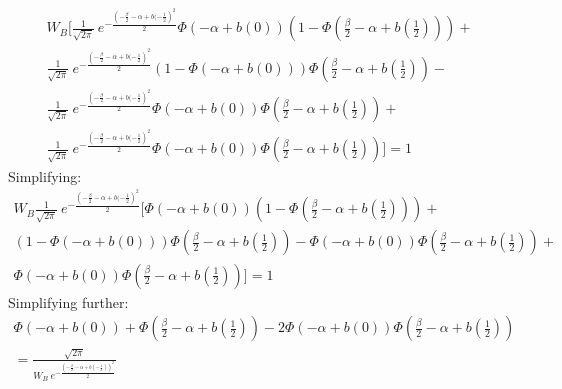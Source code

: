 \documentclass[12pt]{article}
\begin{document}
\begin{itemize}
\begin{itemize}
				\begin{multline}
					W_B \biggl[ \frac{1}{\sqrt{2\pi}} \: e^{- \frac{\left(-\frac{\beta}{2} - \alpha + b(-\frac{1}{2}\right)^2}{2}} \Phi\left(- \alpha + b(0) \right)\left(1-\Phi\left(\frac{\beta}{2} - \alpha + b(\frac{1}{2}) \right)\right)  + \\
					\frac{1}{\sqrt{2\pi}} \: e^{- \frac{\left(-\frac{\beta}{2} - \alpha + b(-\frac{1}{2}\right)^2}{2}} \left(1-\Phi\left(- \alpha + b(0) \right)\right)\Phi\left(\frac{\beta}{2} - \alpha + b(\frac{1}{2}) \right) - \\
					\frac{1}{\sqrt{2\pi}} \: e^{- \frac{\left(-\frac{\beta}{2} - \alpha + b(-\frac{1}{2}\right)^2}{2}} \Phi\left(- \alpha + b(0) \right)\Phi\left(\frac{\beta}{2} - \alpha + b(\frac{1}{2}) \right) + \\
					\frac{1}{\sqrt{2\pi}} \: e^{- \frac{\left(-\frac{\beta}{2} - \alpha + b(-\frac{1}{2}\right)^2}{2}} \Phi\left(- \alpha + b(0) \right)\Phi\left(\frac{\beta}{2} - \alpha + b(\frac{1}{2}) \right) \biggr]  = 1
				\end{multline}
			Simplifying:
			\begin{multline}
					W_B \frac{1}{\sqrt{2\pi}} \: e^{- \frac{\left(-\frac{\beta}{2} - \alpha + b(-\frac{1}{2}\right)^2}{2}} \biggl[ \Phi\left(- \alpha + b(0) \right)\left(1-\Phi\left(\frac{\beta}{2} - \alpha + b(\frac{1}{2}) \right)\right)  + \\
					\left(1-\Phi\left(- \alpha + b(0) \right)\right)\Phi\left(\frac{\beta}{2} - \alpha + b(\frac{1}{2}) \right) - 
					\Phi\left(- \alpha + b(0) \right)\Phi\left(\frac{\beta}{2} - \alpha + b(\frac{1}{2}) \right) + \\
					\Phi\left(- \alpha + b(0) \right)\Phi\left(\frac{\beta}{2} - \alpha + b(\frac{1}{2}) \right) \biggr]  = 1
				\end{multline}
			Simplifying further:
			  \begin{multline}
					\Phi\left(- \alpha + b(0) \right)+ \Phi\left(\frac{\beta}{2} - \alpha + b(\frac{1}{2}) \right) 
					- 2\Phi\left(- \alpha + b(0) \right)\Phi\left(\frac{\beta}{2} - \alpha + b(\frac{1}{2}) \right) \\ = \frac{\sqrt{2\pi}}{W_B \: e^{- \frac{\left(-\frac{\beta}{2} - \alpha + b\left(-\frac{1}{2}\right)\right)^2}{2}} }
					\label{eq:firstfoc}
				\end{multline}
			

\end{itemize}
\end{itemize}
\end{document}
